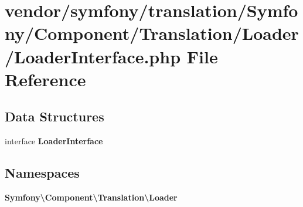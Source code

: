 \section{vendor/symfony/translation/\+Symfony/\+Component/\+Translation/\+Loader/\+Loader\+Interface.php File Reference}
\label{symfony_2translation_2_symfony_2_component_2_translation_2_loader_2_loader_interface_8php}
\subsection*{Data Structures}
\begin{DoxyCompactItemize}
\item 
interface {\bf Loader\+Interface}
\end{DoxyCompactItemize}
\subsection*{Namespaces}
\begin{DoxyCompactItemize}
\item 
 {\bf Symfony\textbackslash{}\+Component\textbackslash{}\+Translation\textbackslash{}\+Loader}
\end{DoxyCompactItemize}
